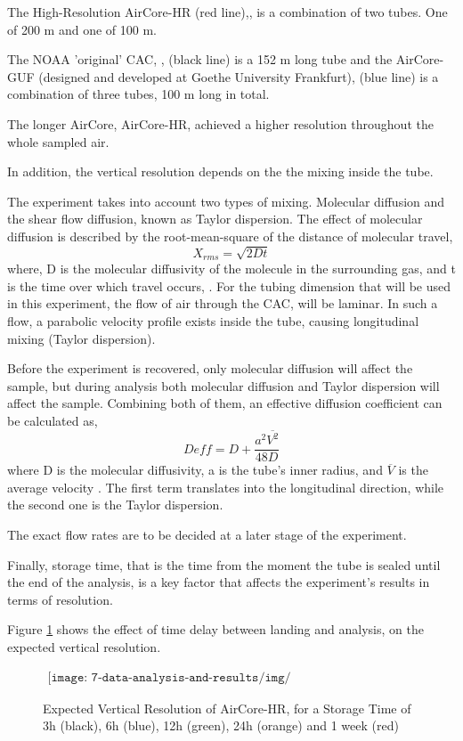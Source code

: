 The High-Resolution AirCore-HR (red line),\cite{Membrive}, is a combination of two tubes. One of 200 m and one of 100 m.

The NOAA 'original' CAC, \cite{Karion}, (black line) is a 152 m long tube and the AirCore-GUF (designed and developed at Goethe University Frankfurt), (blue line) is a combination of three tubes, 100 m long in total.

The longer AirCore, AirCore-HR, achieved a higher resolution throughout the whole sampled air. 

In addition, the vertical resolution depends on the the mixing inside the tube. 

The experiment takes into account two types of mixing. Molecular diffusion and the shear flow diffusion, known as Taylor dispersion. The effect of molecular diffusion is described by the root-mean-square of the distance of molecular travel, 
\begin{equation}
    X_{rms} = \sqrt{2Dt}
\end{equation}
where, D is the molecular diffusivity of the molecule in the surrounding gas, and t is the time over which travel occurs, \cite{Karion}.
For the tubing dimension that will be used in this experiment, the flow of air through the CAC, will be laminar. In such a flow, a parabolic velocity profile exists inside the tube, causing longitudinal mixing (Taylor dispersion). 

Before the experiment is recovered, only molecular diffusion will affect the sample, but during analysis both molecular diffusion and Taylor dispersion will affect the sample. Combining both of them, an effective diffusion coefficient can be calculated as,
 \begin{equation}
     D{eff} = D + \frac{a^2\overline{V^2}}{48D}
 \end{equation}
where D is the molecular diffusivity, a is the tube's inner radius, and $\overline{V}$ is the average velocity \cite{Membrive}. The first term translates into the longitudinal direction, while the second one is the Taylor dispersion.

The exact flow rates are to be decided at a later stage of the experiment.

Finally, storage time, that is the time from the moment the tube is sealed until the end of the analysis, is a key factor that affects the experiment's results in terms of resolution.

Figure \ref{fig:resolution-time} shows the effect of time delay between landing and analysis, on the expected vertical resolution. 
\begin{figure}[H]
    \begin{align*}
        \texttt{[image: 7-data-analysis-and-results/img/ResolutionVsTime.png]}
    \end{align*}
    \caption{Expected Vertical Resolution of AirCore-HR, for a Storage Time of 3h (black), 6h (blue), 12h (green), 24h (orange) and 1 week (red) \cite{Membrive}\label{fig:resolution-time}}
\end{figure}

